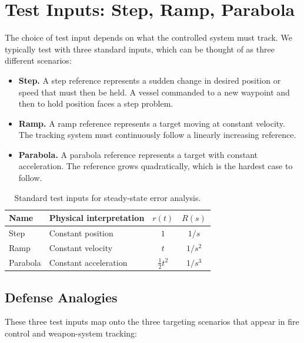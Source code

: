 \documentclass[../../book.tex]{subfiles}
\begin{document}
\section{Test Inputs: Step, Ramp, Parabola}
\label{sec:inputs}

The choice of test input depends on what the controlled system must track.  We typically test with three standard inputs, which can be thought of as three different scenarios:
\begin{itemize}
  \item \textbf{Step.}  A step reference represents a sudden change in desired position or speed that must then be held.  A vessel commanded to a new waypoint and then to hold position faces a step problem.

  \item \textbf{Ramp.}  A ramp reference represents a target moving at constant velocity.  The tracking system must continuously follow a linearly increasing reference.

  \item \textbf{Parabola.}  A parabola reference represents a target with constant acceleration.  The reference grows quadratically, which is the hardest case to follow.
\end{itemize}

\begin{table}[htbp]
\centering
\caption{Standard test inputs for steady-state error analysis.}
\label{tab:inputs}
\begin{tabular}{llcc}
\toprule
Name     & Physical interpretation & $r(t)$             & $R(s)$   \\
\midrule
Step     & Constant position       & $1$                & $1/s$    \\
Ramp     & Constant velocity       & $t$                & $1/s^2$  \\
Parabola & Constant acceleration   & $\frac{1}{2}t^2$   & $1/s^3$  \\
\bottomrule
\end{tabular}
\end{table}

\subsection{Defense Analogies}

These three test inputs map  onto the three targeting
scenarios that appear in fire control and weapon-system tracking:
\end{document}

